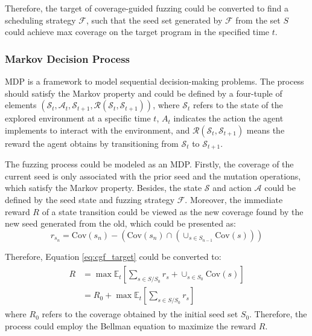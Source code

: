 \documentclass[lettersize,journal]{IEEEtran}
\begin{document}
Therefore, the target of coverage-guided fuzzing could be converted to find a scheduling strategy $\mathcal{F}$, such that the seed set generated by $\mathcal{F}$ from the set $S$ could achieve max coverage on the target program in the specified time $t$.

\subsubsection{Markov Decision Process}\label{subsubsec:markov_decision_process}
MDP is a framework to model sequential decision-making problems. The process should satisfy the Markov property and could be defined by a four-tuple of elements $\left(\mathcal{S}_{t}, \mathcal{A}_{t}, \mathcal{S}_{t+1}, \mathcal{R}(\mathcal{S}_{t}, \mathcal{S}_{t+1})\right)$, where $\mathcal{S}_t$ refers to the state of the explored environment at a specific time $t$, $A_t$ indicates the action the agent implements to interact with the environment, and $\mathcal{R}(\mathcal{S}_{t}, \mathcal{S}_{t+1})$ means the reward the agent obtains by transitioning from $\mathcal{S}_t$ to $\mathcal{S}_{t+1}$.

The fuzzing process could be modeled as an MDP. Firstly, the coverage of the current seed is only associated with the prior seed and the mutation operations, which satisfy the Markov property. Besides, the state $\mathcal{S}$ and action $\mathcal{A}$ could be defined by the seed state and fuzzing strategy $\mathcal{F}$. Moreover,  the immediate reward $R$ of a state transition could be viewed as the new coverage found by the new seed generated from the old, which could be presented as:
\begin{equation}
	r_{s_{n}} = \text{Cov}(s_{n}) - \left(\text{Cov}(s_{n}) \cap (\cup_{s\in S_{n-1}}\text{Cov}(s))\right)
\end{equation}

Therefore, Equation \ref{eq:cgf_target} could be converted to:
\begin{align}
	\begin{split}
		R &= \max{\mathbb{E}_{t}\left[\sum_{s\in S/S_0}r_{s} + \cup_{s\in S_0}\text{Cov}(s)\right]} \\
		&= R_0 + \max{\mathbb{E}_{t}\left[\sum_{s\in S/S_0}r_{s}\right]}
	\end{split}
\end{align}
where $R_0$ refers to the coverage obtained by the initial seed set $S_0$. Therefore, the process could employ the Bellman equation\cite{richardbellmanTheoryDynamicProgramming1952} to maximize the reward $R$.
\end{document}
